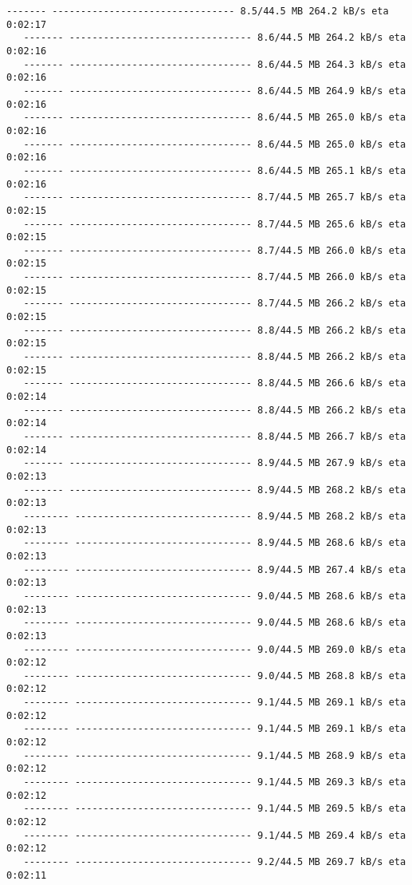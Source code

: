 \documentclass[11pt]{article}
\begin{document}
\begin{Verbatim}[commandchars=\\\{\}]
   ------- -------------------------------- 8.5/44.5 MB 264.2 kB/s eta 0:02:17
   ------- -------------------------------- 8.6/44.5 MB 264.2 kB/s eta 0:02:16
   ------- -------------------------------- 8.6/44.5 MB 264.3 kB/s eta 0:02:16
   ------- -------------------------------- 8.6/44.5 MB 264.9 kB/s eta 0:02:16
   ------- -------------------------------- 8.6/44.5 MB 265.0 kB/s eta 0:02:16
   ------- -------------------------------- 8.6/44.5 MB 265.0 kB/s eta 0:02:16
   ------- -------------------------------- 8.6/44.5 MB 265.1 kB/s eta 0:02:16
   ------- -------------------------------- 8.7/44.5 MB 265.7 kB/s eta 0:02:15
   ------- -------------------------------- 8.7/44.5 MB 265.6 kB/s eta 0:02:15
   ------- -------------------------------- 8.7/44.5 MB 266.0 kB/s eta 0:02:15
   ------- -------------------------------- 8.7/44.5 MB 266.0 kB/s eta 0:02:15
   ------- -------------------------------- 8.7/44.5 MB 266.2 kB/s eta 0:02:15
   ------- -------------------------------- 8.8/44.5 MB 266.2 kB/s eta 0:02:15
   ------- -------------------------------- 8.8/44.5 MB 266.2 kB/s eta 0:02:15
   ------- -------------------------------- 8.8/44.5 MB 266.6 kB/s eta 0:02:14
   ------- -------------------------------- 8.8/44.5 MB 266.2 kB/s eta 0:02:14
   ------- -------------------------------- 8.8/44.5 MB 266.7 kB/s eta 0:02:14
   ------- -------------------------------- 8.9/44.5 MB 267.9 kB/s eta 0:02:13
   ------- -------------------------------- 8.9/44.5 MB 268.2 kB/s eta 0:02:13
   -------- ------------------------------- 8.9/44.5 MB 268.2 kB/s eta 0:02:13
   -------- ------------------------------- 8.9/44.5 MB 268.6 kB/s eta 0:02:13
   -------- ------------------------------- 8.9/44.5 MB 267.4 kB/s eta 0:02:13
   -------- ------------------------------- 9.0/44.5 MB 268.6 kB/s eta 0:02:13
   -------- ------------------------------- 9.0/44.5 MB 268.6 kB/s eta 0:02:13
   -------- ------------------------------- 9.0/44.5 MB 269.0 kB/s eta 0:02:12
   -------- ------------------------------- 9.0/44.5 MB 268.8 kB/s eta 0:02:12
   -------- ------------------------------- 9.1/44.5 MB 269.1 kB/s eta 0:02:12
   -------- ------------------------------- 9.1/44.5 MB 269.1 kB/s eta 0:02:12
   -------- ------------------------------- 9.1/44.5 MB 268.9 kB/s eta 0:02:12
   -------- ------------------------------- 9.1/44.5 MB 269.3 kB/s eta 0:02:12
   -------- ------------------------------- 9.1/44.5 MB 269.5 kB/s eta 0:02:12
   -------- ------------------------------- 9.1/44.5 MB 269.4 kB/s eta 0:02:12
   -------- ------------------------------- 9.2/44.5 MB 269.7 kB/s eta 0:02:11

\end{Verbatim}
\end{document}
